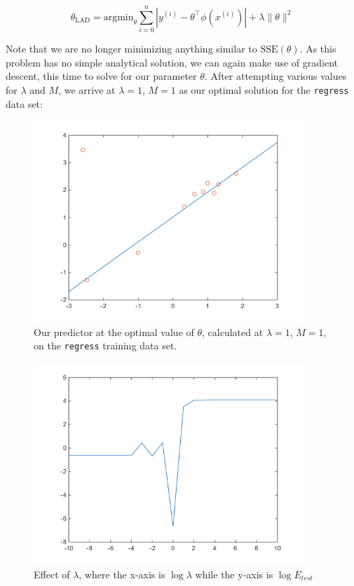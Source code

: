 \documentclass[10pt,letterpaper]{article}
\begin{document}
$$\theta_{\text{LAD}} = \text{argmin}_\theta\sum_{i=0}^n|y^{(i)} - \theta^\intercal\phi(x^{(i)})| + \lambda\lVert\theta\rVert^2$$

Note that we are no longer minimizing anything similar to $\text{SSE}(\theta)$. As this problem has no simple analytical solution, we can again make use of gradient descent, this time to solve for our parameter $\theta$. After attempting various values for $\lambda$ and $M$, we arrive at $\lambda = 1$, $M=1$ as our optimal solution for the \texttt{regress} data set:

\begin{figure}[!htb]
\begin{center}
\includegraphics[width=4in]{figures/line.png}
\caption{Our predictor at the optimal value of $\theta$, calculated at $\lambda=1$, $M=1$, on the \texttt{regress} training data set.}\label{fig:line}
\end{center}
\end{figure}

\begin{figure}[!htb]
\begin{center}
\includegraphics[width=4in]{figures/lambdaline.png}
\caption{Effect of $\lambda$, where the x-axis is $\log \lambda$ while the y-axis is $\log E_{test}$}\label{fig:lambdaline}
\end{center}
\end{figure}
\end{document}

